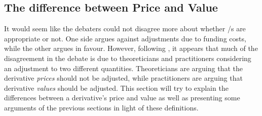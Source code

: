 \documentclass[main.tex]{subfiles}
\begin{document}
    \subsection{The difference between Price and Value}
    \label{sec:price-versus-value}

    It would seem like the debaters could not disagree more 
    about whether \FVA/s are appropriate or not.
    One side argues against adjustments due to funding costs, while the other argues in favour.
    However, following \cite{Ruiz2015XVA}, 
    it appears that much of the disagreement in the debate is due to theoreticians and practitioners
    considering an adjustment to two different quantities.
    Theoreticians are arguing that the derivative \textit{prices} should not be adjusted,
    while practitioners are arguing that derivative \textit{values} should be adjusted.
    This section will try to explain the differences between a derivative's price and value
    as well as presenting some arguments of the previous sections in light of these definitions.
\end{document}
